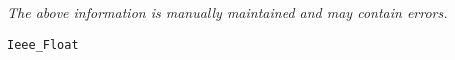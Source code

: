 \label{pkg:ieee\_float}

{\tiny \it The above information is manually maintained and may contain errors.}
\begin{verbatim}
Ieee_Float
\end{verbatim}

